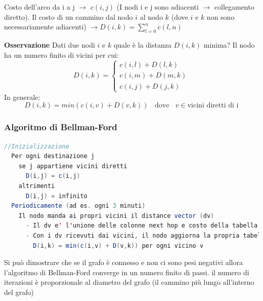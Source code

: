\documentclass[a4paper]{article}
\begin{document}
Costo dell'arco da i a j $\rightarrow$ $c(i,j)$ (I nodi i e j sono adiacenti $\rightarrow$ collegamento diretto).
Il costo di un cammino dal nodo $i$ al nodo $k$ (dove $i$ e $k$ non sono necessariamente adiacenti) 
$\rightarrow D(i,k) = \sum_{l = 0}^{n} c(l,n)$ 

\vspace{1em}
\noindent
\textbf{Osservazione}
Dati due nodi $i$ e $k$ quale è la distanza $D(i, k)$ minima?
Il nodo ha un numero finito di vicini per cui:
\[D(i,k) = \begin{cases}
  c(i,l) + D(l,k)\\
  c(i,m) + D(m,k)\\
  c(i,j) + D(j,k)
\end{cases}\]
In generale:
\[D(i,k) = min(c(i,v) + D(v,k)) \; \; \text{ dove } \; \; v \in \text{vicini diretti di i}\]
\subsubsection{Algoritmo di Bellman-Ford}
\begin{lstlisting}[language=Scala]
  //Inizializzazione
  Per ogni destinazione j
    se j appartiene vicini diretti 
      D(i,j) = c(i,j)
    altrimenti
      D(i,j) = infinito
  Periodicamente (ad es. ogni 3 minuti)
    Il nodo manda ai propri vicini il distance vector (dv)
      - Il dv e' l'unione delle colonne next hop e costo della tabella di routing del nodo
      - Con i dv ricevuti dai vicini, il nodo aggiorna la propria tabella di routing per ogni destinaizone
        D(i,k) = min(c(i,v) + D(v,k)) per ogni vicino v
\end{lstlisting}
\noindent
Si può dimostrare che se il grafo è connesso e non ci sono pesi negativi allora l'algoritmo di Bellman-Ford converge in un numero finito di passi.
il numero di iterazioni è proporzionale al diametro del grafo (il cammino più lungo all'interno del grafo)
\end{document}

